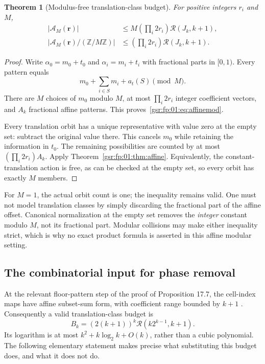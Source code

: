 \documentclass[11pt,letterpaper]{article}
\numberwithin{equation}{section}
\newtheorem{theorem}{Theorem}[section]
\theoremstyle{definition}
\theoremstyle{remark}
\newcommand{\Z}{\mathbb Z}
\newcommand{\1}{\mathbf 1}
\newcommand{\RR}[2]{\mathcal R(#1,#2)}
\begin{document}
\begin{theorem}[Modulus-free translation-class budget]\label{gsr:fp:01:thm:orbits}
For positive integers $r_i$ and $M$,
\begin{align}
 |\mathcal A_M(\mathbf r)|
 &\le M\left(\prod_i2r_i\right)\RR{J_k}{k+1},\label{gsr:fp:01:eq:affinemod}\\
 |\mathcal A_M(\mathbf r)/(\Z/M\Z)|
 &\le\left(\prod_i2r_i\right)\RR{J_k}{k+1}.\label{gsr:fp:01:eq:orbitbound}
\end{align}
\end{theorem}
\begin{proof}
Write $\alpha_0=m_0+t_0$ and $\alpha_i=m_i+t_i$ with fractional parts
in $[0,1)$. Every pattern equals
\[
 m_0+\sum_{i\in S}m_i+a_t(S)\pmod M.
\]
There are $M$ choices of $m_0$ modulo $M$, at most $\prod_i2r_i$
integer coefficient vectors, and $A_k$ fractional affine patterns.
This proves~\eqref{gsr:fp:01:eq:affinemod}.

Every translation orbit has a unique representative with value zero at
the empty set: subtract the original value there. This cancels $m_0$
while retaining the information in $t_0$. The remaining possibilities
are counted by at most $(\prod_i2r_i)A_k$. Apply
Theorem~\ref{gsr:fp:01:thm:affine}. Equivalently, the constant-translation action
is free, as can be checked at the empty set, so every orbit has exactly
$M$ members.
\end{proof}

For $M=1$, the actual orbit count is one; the inequality remains valid.
One must not model translation classes by simply discarding the fractional
part of the affine offset. Canonical normalization at the empty set
removes the \emph{integer} constant modulo $M$, not its fractional part.
Modular collisions may make either inequality strict, which is why no
exact product formula is asserted in this affine modular setting.

\subsection{The combinatorial input for phase removal}
At the relevant floor-pattern step of the proof of Proposition 17.7,
the cell-index maps have affine subset-sum form, with coefficient range
bounded by $k+1$ \cite[proof of Proposition 17.7]{gowers}.
Consequently a valid translation-class budget is
\begin{equation}\label{gsr:fp:01:eq:Bk}
 B_k=(2(k+1))^k\RR{k2^{k-1}}{k+1}.
\end{equation}
Its logarithm is at most $k^2+k\log_2k+O(k)$, rather than a cubic polynomial.
The following elementary statement makes precise what substituting this
budget does, and what it does not do.
\end{document}
